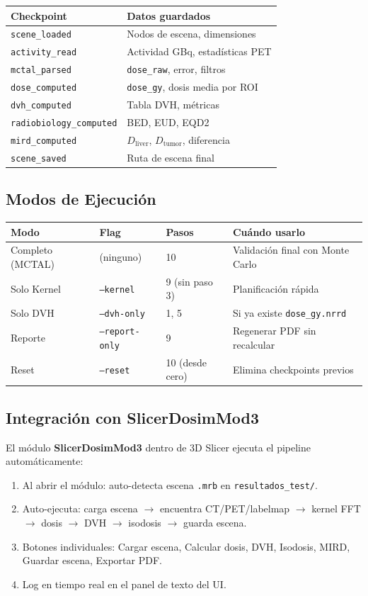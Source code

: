 \documentclass[12pt,a4paper]{article}
\begin{document}
\begin{tabular}{p{4cm} p{10cm}}
\toprule
\textbf{Checkpoint} & \textbf{Datos guardados} \\
\midrule
\texttt{scene\_loaded} & Nodos de escena, dimensiones \\
\texttt{activity\_read} & Actividad GBq, estadísticas PET \\
\texttt{mctal\_parsed} & \texttt{dose\_raw}, error, filtros \\
\texttt{dose\_computed} & \texttt{dose\_gy}, dosis media por ROI \\
\texttt{dvh\_computed} & Tabla DVH, métricas \\
\texttt{radiobiology\_computed} & BED, EUD, EQD2 \\
\texttt{mird\_computed} & $D_{\text{liver}}$, $D_{\text{tumor}}$, diferencia \\
\texttt{scene\_saved} & Ruta de escena final \\
\bottomrule
\end{tabular}

\subsection{Modos de Ejecución}

\begin{tabular}{p{3cm} p{3cm} p{2cm} p{6cm}}
\toprule
\textbf{Modo} & \textbf{Flag} & \textbf{Pasos} & \textbf{Cuándo usarlo} \\
\midrule
Completo (MCTAL) & (ninguno) & 10 & Validación final con Monte Carlo \\
Solo Kernel & \texttt{--kernel} & 9 (sin paso 3) & Planificación rápida \\
Solo DVH & \texttt{--dvh-only} & 1, 5 & Si ya existe \texttt{dose\_gy.nrrd} \\
Reporte & \texttt{--report-only} & 9 & Regenerar PDF sin recalcular \\
Reset & \texttt{--reset} & 10 (desde cero) & Elimina checkpoints previos \\
\bottomrule
\end{tabular}

\subsection{Integración con SlicerDosimMod3}

El módulo \textbf{SlicerDosimMod3} dentro de 3D Slicer ejecuta el pipeline automáticamente:

\begin{enumerate}
  \item Al abrir el módulo: auto-detecta escena \texttt{.mrb} en \texttt{resultados\_test/}.
  \item Auto-ejecuta: carga escena $\to$ encuentra CT/PET/labelmap $\to$ kernel FFT $\to$ dosis $\to$ DVH $\to$ isodosis $\to$ guarda escena.
  \item Botones individuales: Cargar escena, Calcular dosis, DVH, Isodosis, MIRD, Guardar escena, Exportar PDF.
  \item Log en tiempo real en el panel de texto del UI.
\end{enumerate}
\end{document}
